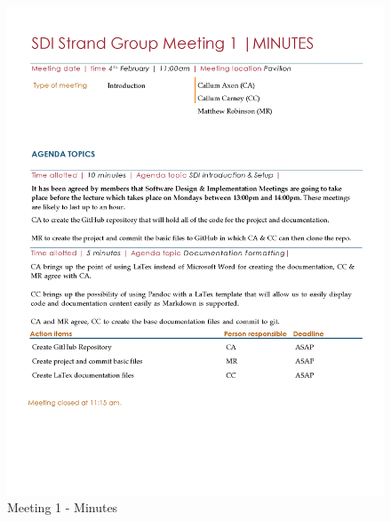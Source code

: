 \documentclass[
  english,
  a4paper,
,tablecaptionabove
]{scrartcl}
\begin{document}
\begin{figure}
\centering
\includegraphics{images/meeting-minutes/meeting-1.png}
\caption{Meeting 1 - Minutes}
\end{figure}
\end{document}
